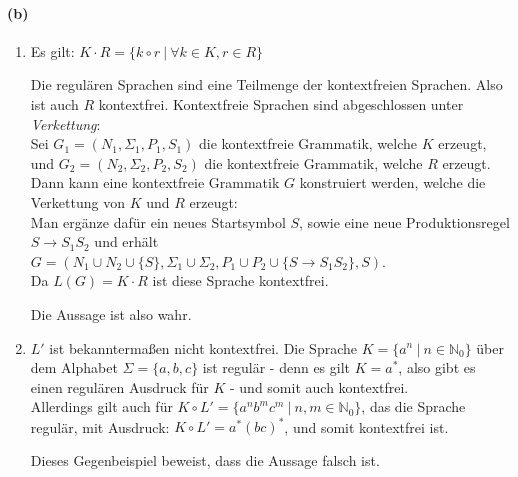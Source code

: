 \paragraph{(b)}
	\begin{enumerate}[label=\roman*.]
		\item
		Es gilt: $K\cdot R = \{k\circ r\ |\ \forall k \in K, r \in R\}$

		Die regulären Sprachen sind eine Teilmenge der kontextfreien Sprachen.
		Also ist auch $R$ kontextfrei. Kontextfreie Sprachen sind abgeschlossen unter \emph{Verkettung}: \\
		Sei $G_1 = (N_1, \Sigma_1, P_1, S_1)$ die kontextfreie Grammatik, welche $K$ erzeugt, und $G_2 = (N_2, \Sigma_2, P_2, S_2)$ die kontextfreie Grammatik, welche $R$ erzeugt. Dann kann eine kontextfreie Grammatik $G$ konstruiert werden, welche die Verkettung von $K$ und $R$ erzeugt:\\
		Man ergänze dafür ein neues Startsymbol $S$, sowie eine neue Produktionsregel $S \rightarrow S_1S_2$ und erhält $G = (N_1 \cup N_2 \cup \{S\}, \Sigma_1 \cup \Sigma_2, P_1 \cup P_2 \cup \{S \rightarrow S_1S_2\}, S)$.\\
		Da $L(G)=K\cdot R$ ist diese Sprache kontextfrei.

		Die Aussage ist also wahr.
				
		\item
		$L'$ ist bekanntermaßen nicht kontextfrei. Die Sprache $K = \{a^n\ |\ n \in \mathbb{N}_0\}$ über dem Alphabet $\Sigma = \{a,b,c\}$ ist regulär - denn es gilt $K = a^*$, also gibt es einen regulären Ausdruck für $K$ - und somit auch kontextfrei.\\
		Allerdings gilt auch für $K \circ L' = \{a^nb^mc^m\ |\ n,m \in \mathbb{N}_0\}$, das die Sprache regulär, mit Ausdruck: $K \circ L'= a^*(bc)^*$, und somit kontextfrei ist.
		
		Dieses Gegenbeispiel beweist, dass die Aussage falsch ist.
		
	\end{enumerate}
